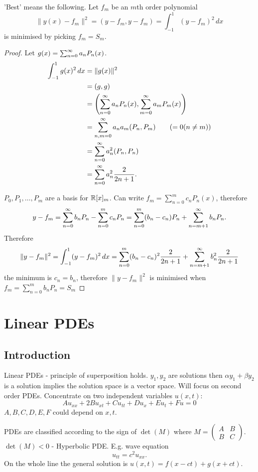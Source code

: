 \documentclass[10pt, a4paper]{article}
\begin{document}
'Best' means the following.
Let $f_m$ be an $m$th order polynomial
\[
\|y(x) - f_m\| ^ 2 = (y - f_m, y - f_m) = \int_{-1}^{1}(y - f_m) ^ 2\,dx
\]
is minimised by picking $f_m = S_m$.
\begin{proof}
    Let $g(x) = \infsum[n = 0]a_nP_n(x)$.
    \begin{align*}
        \int_{-1}^{1}g(x) ^ 2\,dx &= \|g(x)\| ^ 2 \\
        &= (g, g) \\
        &= \left(\infsum[n = 0]a_nP_n(x), \infsum[m = 0]a_mP_m(x)\right) \\
        &= \infsum[n, m = 0]a_na_m(P_n, P_m) \qquad(= 0 (n \neq m)) \\
        &= \infsum[n = 0]a_n ^ 2(P_n, P_n) \\
        &= \infsum[n = 0]a_n ^ 2\frac{2}{2n + 1}.
    \end{align*}

    $P_0, P_1, \dotsc, P_m$ are a basis for $\R[x]_m$.
    Can write $f_m = \sum_{n = 0}^{m}c_nP_n(x)$,
    therefore
    \[
    y - f_m = \infsum[n = 0]b_nP_n - \sum_{n = 0}^{m}c_nP_n = \sum_{n = 0}^{m}(b_n - c_n)P_n + \infsum[n = m + 1]b_nP_n.
    \]
    Therefore
    \[
    \|y - f_m\| ^ 2 = \int_{-1}^{1}(y - f_m) ^ 2\,dx = \sum_{n = 0}^{m}(b_n - c_n) ^ 2\frac{2}{2n + 1} + \infsum[n = m + 1]b_n ^ 2\frac{2}{2n + 1}
    \]
    the minimum is $c_n = b_n$,
    therefore $\|y - f_m\| ^ 2$ is minimised when $f_m = \sum_{n = 0}^{m}b_nP_n = S_m$
\end{proof}

\newpage

\section{Linear PDEs}

\subsection{Introduction}

Linear PDEs - principle of superposition holds.
$y_1, y_2$ are solutions then $\alpha y_1 + \beta y_2$ is a solution implies the solution space is a vector space.
Will focus on second order PDEs.
Concentrate on two independent variables $u(x, t)$:
\[
Au_{xx} + 2Bu_{xt} + Cu_{tt} + Du_x + Eu_t + Fu = 0
\]
$A, B, C, D, E, F$ could depend on $x, t$.

PDEs are classified according to the sign of $\det(M)$ where $M = \begin{pmatrix}
    A & B \\ B & C
\end{pmatrix}$.
$\det(M) < 0$ - Hyperbolic PDE.
E.g.
wave equation
\[
u_{tt} = c ^ 2u_{xx}.
\]
On the whole line the general solution is $u(x, t) = f(x - ct) + g(x + ct)$.
\end{document}

